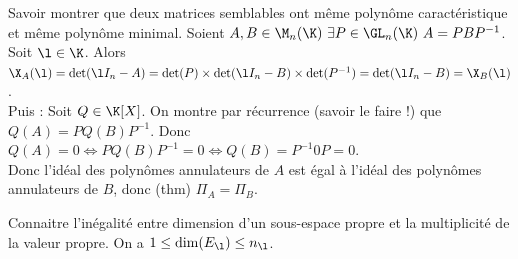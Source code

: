 \documentclass[french, 11pt]{article}
\begin{document}
\begin{exercice}{}{}
    Savoir montrer que deux matrices semblables ont même polynôme caractéristique et même polynôme minimal.
    \tcblower
    Soient $A,B \in \M_n(\K) ~ \exists P \in \GL_n(\K) ~ A = PBP^{-1}$.\\
    Soit $\l \in \K$. Alors $\X_A(\l)=\det(\l I_n - A) = \det(P)\times\det(\l I_n - B)\times \det(P^{-1})=\det(\l I_n - B) = \X_B(\l)$.\\
    Puis : Soit $Q \in \K[X]$. On montre par récurrence (savoir le faire !) que $Q(A) = PQ(B)P^{-1}$. Donc $Q(A) = 0 \Leftrightarrow PQ(B)P^{-1} = 0 \Leftrightarrow Q(B) = P^{-1}0P = 0$.\\
    Donc l'idéal des polynômes annulateurs de $A$ est égal à l'idéal des polynômes annulateurs de $B$, donc (thm) $\Pi_A = \Pi_B$.
\end{exercice}

\begin{exercice}{}{}
    Connaitre l'inégalité entre dimension d'un sous-espace propre et la multiplicité de la valeur propre.
    \tcblower
    On a $1 \le \dim(E_{\l}) \le n_{\l}$.
\end{exercice}
\end{document}
